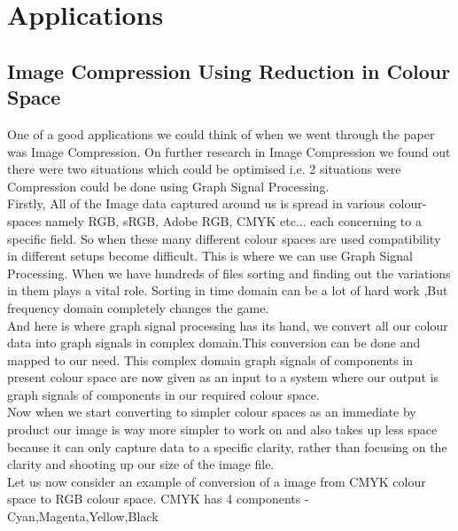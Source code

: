 \documentclass[12pt,onecolumn]{article}
\begin{document}
\newline

\section{\textbf{Applications}}
\subsection{\textbf{Image Compression Using Reduction in Colour Space }}

One of a good applications we could think of when we went through the paper was Image Compression.
On further research in Image Compression we found out there were two situations which could be optimised i.e. 2 situations were Compression could be done using Graph Signal Processing.\\
\newline
Firstly, All of the Image data captured around us is spread in various colour-spaces namely RGB, sRGB, Adobe RGB, CMYK etc... each concerning to a specific  field. So when these many different colour spaces are used compatibility in different setups become difficult. This is where we can use Graph Signal Processing. When we have hundreds of files sorting and finding out the variations in them plays a vital role. Sorting in time domain can be a lot of hard work ,But frequency domain completely changes the game.\\
\newline
And here is where graph signal processing has its hand, we convert all our colour data into graph signals in complex domain.This conversion can be done and mapped to our need. This complex domain graph signals of components in present colour space are now given as an input to a system where our output is graph signals of components in our required colour space.\\
\newline
Now when we start converting to simpler colour spaces as an immediate by product our image is way more simpler to work on and also takes up less space because it can only capture data to a specific clarity, rather than focusing on the clarity and shooting up our size of the image file.\\
\newline
Let us now consider an example of conversion of a image from CMYK colour space to RGB colour space.
\newline
CMYK has 4 components - Cyan,Magenta,Yellow,Black \\
\end{document}
